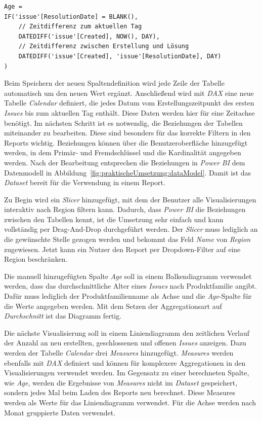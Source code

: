 \begin{minipage}{\linewidth}
\begin{lstlisting}[caption=Code zur Defintion der Spalte \textit{Age} von Tabelle \textit{Issue},captionpos=b,style=sharpc]
Age = 
IF('issue'[ResolutionDate] = BLANK(),
    // Zeitdifferenz zum aktuellen Tag
    DATEDIFF('issue'[Created], NOW(), DAY),
    // Zeitdifferenz zwischen Erstellung und Lösung
    DATEDIFF('issue'[Created], 'issue'[ResolutionDate], DAY)
)
\end{lstlisting}
\end{minipage}

\noindent Beim Speichern der neuen Spaltendefinition wird jede Zeile der Tabelle automatisch um den neuen Wert ergänzt. Anschließend wird mit \textit{DAX} eine neue Tabelle \textit{Calendar} definiert, die jedes Datum vom Erstellungszeitpunkt des ersten \textit{Issues} bis zum aktuellen Tag enthält. Diese Daten werden hier für eine Zeitachse benötigt. Im nächsten Schritt ist es notwendig, die Beziehungen der Tabellen miteinander zu bearbeiten. Diese sind besonders für das korrekte Filtern in den Reports wichtig. Beziehungen können über die Benutzeroberfläche hinzugefügt werden, in dem Primär- und Fremdschlüssel und die Kardinalität angegeben werden. Nach der Bearbeitung entsprechen die Beziehungen in \textit{Power BI} dem Datenmodell in Abbildung~\ref{fig:praktischeUmsetzung:dataModel}. Damit ist das \textit{Dataset} bereit für die Verwendung in einem Report.

Zu Begin wird ein \textit{Slicer} hinzugefügt, mit dem der Benutzer alle Visualisierungen interaktiv nach Region filtern kann. Dadurch, dass \textit{Power BI} die Beziehungen zwischen den Tabellen kennt, ist die Umsetzung sehr einfach und kann vollständig per Drag-And-Drop durchgeführt werden. Der \textit{Slicer} muss lediglich an die gewünschte Stelle gezogen werden und bekommt das Feld \textit{Name} von \textit{Region} zugewiesen. Jetzt kann ein Nutzer den Report per Dropdown-Filter auf eine Region beschränken.

Die manuell hinzugefügten Spalte \textit{Age} soll in einem Balkendiagramm verwendet werden, dass das durchschnittliche Alter eines \textit{Issues} nach Produktfamilie angibt. Dafür muss lediglich der Produktfamilienname als Achse und die \textit{Age}-Spalte für die Werte angegeben werden. Mit dem Setzen der Aggregationsart auf \textit{Durchschnitt} ist das Diagramm fertig.

Die nächste Visualisierung soll in einem Liniendiagramm den zeitlichen Verlauf der Anzahl an neu erstellten, geschlossenen und offenen \textit{Issues} anzeigen. Dazu werden der Tabelle \textit{Calendar} drei \textit{Measures} hinzugefügt. \textit{Measures} werden ebenfalls mit \textit{DAX} definiert und können für komplexere Aggregationen in den Visualisierungen verwendet werden. Im Gegensatz zu einer berechneten Spalte, wie \textit{Age}, werden die Ergebnisse von \textit{Measures} nicht im \textit{Dataset} gespeichert, sondern jedes Mal beim Laden des Reports neu berechnet. Diese Measures werden als Werte für das Liniendiagramm verwendet. Für die Achse werden nach Monat gruppierte Daten verwendet.

